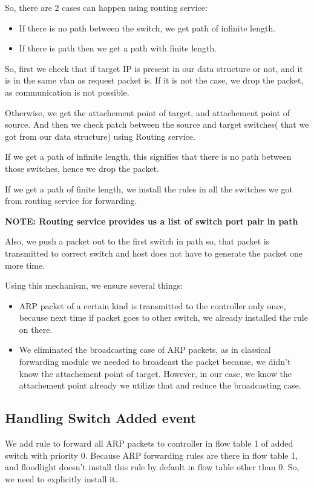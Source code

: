 \documentclass{article}
\begin{document}
So, there are 2 cases can happen using routing service:
\begin{itemize}
	\item If there is no path between the switch, we get path of infinite length.
	\item If there is path then we get a path with finite length.
\end{itemize}

So, first we check that if target IP is present in our data structure or not, and it is in the same vlan as request packet is. If it is not the case, we drop the packet, as communication is not possible.

Otherwise, we get the attachement point of target, and attachement point of source. 
And then we check patch between the source and target switches( that we got from our data structure) using Routing service.

If we get a path of infinite length, this signifies that there is no path between those switches, hence we drop the packet.

If we get a path of finite length, we install the rules in all the switches we got from routing service for forwarding.

\textbf{NOTE: Routing service provides us a list of switch port pair in path}

Also, we push a packet out to the first switch in path so, that packet is transmitted to correct switch and host does not have to generate the packet one more time.

Using this mechanism, we ensure several things:
\begin{itemize}
	\item ARP packet of a certain kind is transmitted to the controller only once, because next time if packet goes to other switch, we already installed the rule on there.
	\item We eliminated the broadcasting case of ARP packets, as in classical forwarding module we needed to broadcast the packet because, we didn't know the attachement point of target. However, in our case, we know the attachement point already we utilize that and reduce the broadcasting case.
\end{itemize}

\subsection{Handling Switch Added event}

We add rule to forward all ARP packets to controller in flow table 1 of added switch with priority 0. Because ARP forwarding rules are there in flow table 1, and floodlight doesn't install this rule by default in flow table other than 0. So, we need to explicitly install it.
\end{document}
